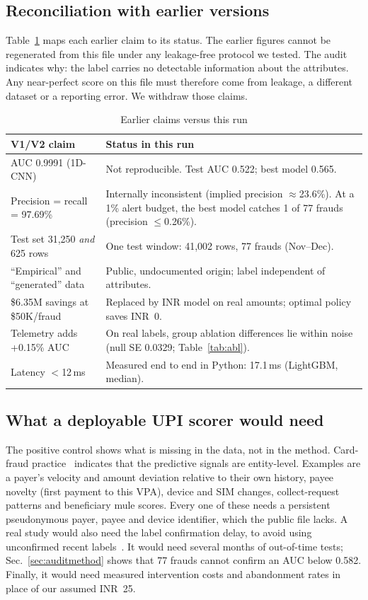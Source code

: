 \documentclass[conference]{IEEEtran}
\newcommand{\inr}{INR~}
\begin{document}
\subsection{Reconciliation with earlier versions}
Table~\ref{tab:recon} maps each earlier claim to its status. The earlier figures cannot be regenerated from this file under any leakage-free protocol we tested. The audit indicates why: the label carries no detectable information about the attributes. Any near-perfect score on this file must therefore come from leakage, a different dataset or a reporting error. We withdraw those claims.

\begin{table}[t]
\centering
\caption{Earlier claims versus this run}\label{tab:recon}
\footnotesize
\begin{tabular}{@{}p{3.1cm}p{4.6cm}@{}}
\toprule
V1/V2 claim & Status in this run \\
\midrule
AUC 0.9991 (1D-CNN) & Not reproducible. Test AUC 0.522; best model 0.565. \\
Precision = recall = 97.69\% & Internally inconsistent (implied precision $\approx$23.6\%). At a 1\% alert budget, the best model catches 1 of 77 frauds (precision $\le$0.26\%). \\
Test set 31,250 \emph{and} 625 rows & One test window: 41,002 rows, 77 frauds (Nov--Dec). \\
``Empirical'' and ``generated'' data & Public, undocumented origin; label independent of attributes. \\
\$6.35M savings at \$50K/fraud & Replaced by INR model on real amounts; optimal policy saves \inr0. \\
Telemetry adds +0.15\% AUC & On real labels, group ablation differences lie within noise (null SE 0.0329; Table~\ref{tab:abl}). \\
Latency $<$12\,ms & Measured end to end in Python: 17.1\,ms (LightGBM, median). \\
\bottomrule
\end{tabular}
\end{table}

\subsection{What a deployable UPI scorer would need}
The positive control shows what is missing in the data, not in the method. Card-fraud practice~\cite{whitrow2009,bahnsen2016} indicates that the predictive signals are entity-level. Examples are a payer's velocity and amount deviation relative to their own history, payee novelty (first payment to this VPA), device and SIM changes, collect-request patterns and beneficiary mule scores. Every one of these needs a persistent pseudonymous payer, payee and device identifier, which the public file lacks. A real study would also need the label confirmation delay, to avoid using unconfirmed recent labels~\cite{dalpozzolo2018}. It would need several months of out-of-time tests; Sec.~\ref{sec:auditmethod} shows that 77 frauds cannot confirm an AUC below 0.582. Finally, it would need measured intervention costs and abandonment rates in place of our assumed \inr25.
\end{document}
